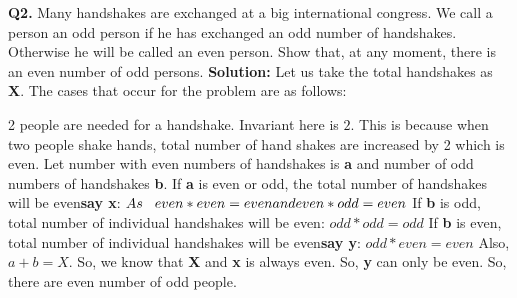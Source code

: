 \documentclass{article}
\begin{document}
\begin{flushleft}
\textbf{Q2. } Many handshakes are exchanged at a big international congress. We call a person an odd person if he has exchanged an odd number of handshakes. Otherwise he will be called an even person. Show that, at any moment, there is an even number of odd persons.
\newline
\newline
\textbf{Solution: } Let us take the total handshakes as \textbf{X}.
\newline
The cases that occur for the problem are as follows:

\newcommand\tab[1][0.1cm]{\hspace*{#1}}
    2 people are needed for a handshake. Invariant here is $2$. This is because when two people shake hands, total number of hand shakes are increased by 2 which is even. Let number with even numbers of handshakes is \textbf{a} and number of odd numbers of handshakes \textbf{b}.
    \newline
    \newline
    If \textbf{a} is even or odd, the total number of handshakes will be even\tab[0.1cm]\textbf{say x}: 
    $As \tab[0.3cm]even * even = even and  even * odd = even$
    \newline
    \newline
    If \textbf{b} is odd, total number of individual handshakes will be even: $   odd * odd = odd$
    \newline
    \newline
    If \textbf{b} is even, total number of individual handshakes will be even\tab[0.1cm]\textbf{say y}: $odd * even = even$
    \newline
    \newline
    Also, \(a + b = X\). So, we know that \textbf{X} and \textbf{x} is always even. So, \textbf{y} can only be even.
So, there are even number of odd people.
\end{flushleft}
\end{document}
